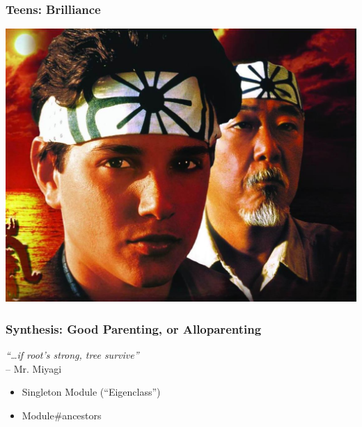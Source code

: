 \documentclass[slidestop,compress,mathserif]{beamer}
\begin{document}
\begin{frame}
	\frametitle{Teens:  Brilliance}
	\includegraphics[scale=0.25]{img/daniel.jpg}	
\end{frame}

\begin{frame}
	\frametitle{Synthesis:  Good Parenting, or Alloparenting}
	\begin{center}
		\emph{``{\ldots}if root's strong, tree survive''} \\
		-- Mr. Miyagi
	\end{center}
	\begin{itemize}
		\item Singleton Module (``Eigenclass'')
		\item Module\#ancestors
	\end{itemize}
\end{frame}

\end{document}
